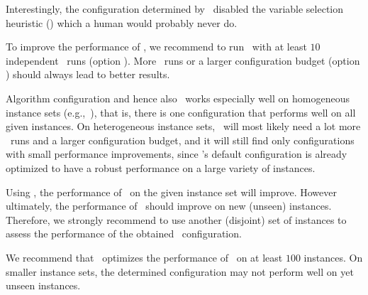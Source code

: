 Interestingly, the configuration determined by \piclasp\ disabled the variable selection heuristic ()
which a human would probably never do.


\begin{note}
To improve the performance of \piclasp, 
we recommend to run \piclasp\ with at least $10$ independent \smac\ runs (option ).
More \smac\ runs or a larger configuration budget (option ) should always lead to better results.   
\end{note}

\begin{note}
Algorithm configuration and hence also \piclasp\ works especially well on homogeneous instance sets (e.g.,~\cite{gejokaobsascsc13a}),
that is, there is one configuration that performs well on all given instances.
On heterogeneous instance sets, \piclasp\ will most likely need a lot more \smac\ runs and a larger configuration budget,
and it will still find only configurations with small performance improvements, 
since \clasp's default configuration is already optimized to have a robust performance on a large variety of instances.
\end{note}

\begin{note}
Using \piclasp, the performance of \clasp\ on the given instance set will improve.
However ultimately, the performance of \clasp\ should improve on new (unseen) instances.
Therefore, we strongly recommend to use another (disjoint) set of instances to assess the performance of the obtained \clasp\ configuration.
\end{note}

\begin{note}
We recommend that \piclasp\ optimizes the performance of \clasp\ on at least $100$ instances.
On smaller instance sets, the determined configuration may not perform well on yet unseen instances.
\end{note}



